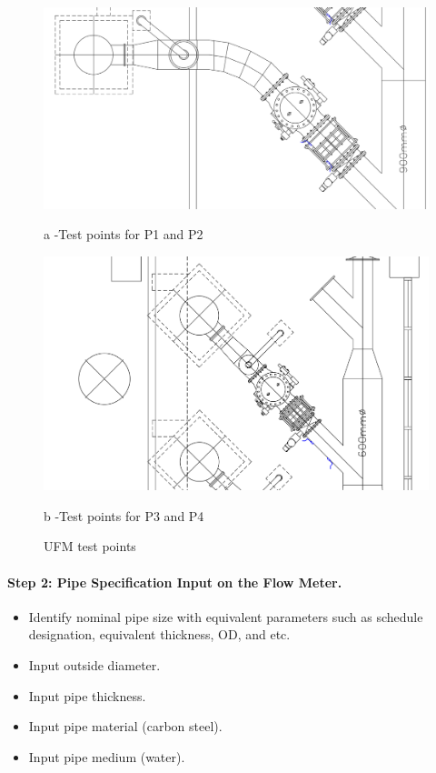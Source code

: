 \begin{figure}[ht]
	\begin{minipage}[b]{0.5\linewidth}
		\centering
		\includegraphics[width=\textwidth]{figures/fig_ch02_ufmA}
		\caption*{a -Test points for P1 and P2}
	\end{minipage}
	\hspace{0.05cm}
	\begin{minipage}[b]{0.5\linewidth}
		\centering
		\includegraphics[width=\textwidth]{figures/fig_ch02_ufmB}
		\caption*{b -Test points for P3 and P4}
	\end{minipage}
	\caption{UFM test points}
	\label{fig_ch02_ufm}
\end{figure}



\paragraph{Step 2: Pipe Specification Input on the Flow Meter.}
\begin{itemize}
\item Identify nominal pipe size with equivalent parameters such as schedule designation, equivalent thickness, OD, and etc.
\item Input outside diameter.
\item Input pipe thickness.
\item Input pipe material (carbon steel).
\item Input pipe medium (water).

\end{itemize}

